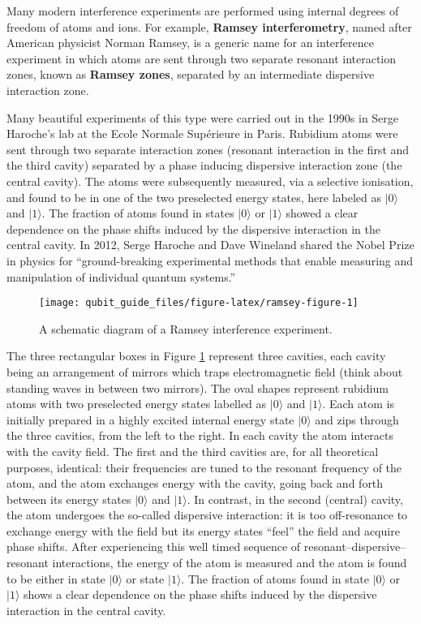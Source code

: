 \documentclass[fleqn]{article}
\begin{document}
Many modern interference experiments are performed using internal degrees of freedom of atoms and ions.
For example, \textbf{Ramsey interferometry}, named after American physicist Norman Ramsey, is a generic name for an interference experiment in which atoms are sent through two separate resonant interaction zones, known as \textbf{Ramsey zones}, separated by an intermediate dispersive interaction zone.

Many beautiful experiments of this type were carried out in the 1990s in Serge Haroche's lab at the Ecole Normale Supérieure in Paris.
Rubidium atoms were sent through two separate interaction zones (resonant interaction in the first and the third cavity) separated by a phase inducing dispersive interaction zone (the central cavity).
The atoms were subsequently measured, via a selective ionisation, and found to be in one of the two preselected energy states, here labeled as \(|0\rangle\) and \(|1\rangle\).
The fraction of atoms found in states \(|0\rangle\) or \(|1\rangle\) showed a clear dependence on the phase shifts induced by the dispersive interaction in the central cavity.
In 2012, Serge Haroche and Dave Wineland shared the Nobel Prize in physics for ``ground-breaking experimental methods that enable measuring and manipulation of individual quantum systems.''



\begin{figure}[H]

{\centering \texttt{[image: qubit\_guide\_files/figure-latex/ramsey-figure-1]} 

}

\caption{A schematic diagram of a Ramsey interference experiment.}\label{fig:ramsey-figure}
\end{figure}

The three rectangular boxes in Figure \ref{fig:ramsey-figure} represent three cavities, each cavity being an arrangement of mirrors which traps electromagnetic field (think about standing waves in between two mirrors).
The oval shapes represent rubidium atoms with two preselected energy states labelled as \(|0\rangle\) and \(|1\rangle\).
Each atom is initially prepared in a highly excited internal energy state \(|0\rangle\) and zips through the three cavities, from the left to the right.
In each cavity the atom interacts with the cavity field.
The first and the third cavities are, for all theoretical purposes, identical: their frequencies are tuned to the resonant frequency of the atom, and the atom exchanges energy with the cavity, going back and forth between its energy states \(|0\rangle\) and \(|1\rangle\).
In contrast, in the second (central) cavity, the atom undergoes the so-called dispersive interaction: it is too off-resonance to exchange energy with the field but its energy states ``feel'' the field and acquire phase shifts.
After experiencing this well timed sequence of resonant--dispersive--resonant interactions, the energy of the atom is measured and the atom is found to be either in state \(|0\rangle\) or state \(|1\rangle\).
The fraction of atoms found in state \(|0\rangle\) or \(|1\rangle\) shows a clear dependence on the phase shifts induced by the dispersive interaction in the central cavity.
\end{document}
